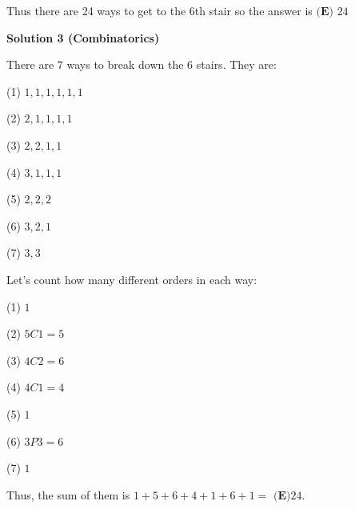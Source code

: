 \begin{enumerate}
 Thus there are 24 ways to get to the 6th stair so the answer is $\boxed{\textbf{(E) } 24}$




\textbf{Solution 3 (Combinatorics)}

There are $7$ ways to break down the $6$ stairs. They are:

 (1) $1,1,1,1,1,1$

 (2) $2,1,1,1,1$

 (3) $2,2,1,1$

 (4) $3,1,1,1$

 (5) $2,2,2$

 (6) $3,2,1$

 (7) $3,3$

 Let's count how many different orders in each way:

 (1) $1$ 

 (2) $5C1=5$

 (3) $4C2 = 6$

 (4) $4C1 = 4$

 (5) $1$

 (6) $3P3 = 6$

 (7) $1$

 Thus, the sum of them is $1+5+6+4+1+6+1=$ $\boxed{\textbf{(E)}24}$.

 


\end{enumerate}